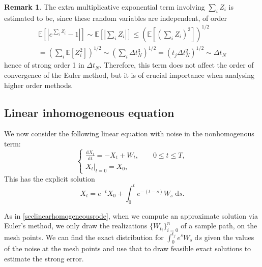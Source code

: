 \documentclass[reqno,12pt]{amsart}
\theoremstyle{plain}%
\theoremstyle{definition}
\newtheorem{rmk}{Remark}[section]
\begin{document}
\begin{rmk}
The extra multiplicative exponential term involving $\sum_i Z_i$ is estimated to be, since these random variables are independent, of order 
\begin{multline*}
    \mathbb{E}\left[\left|e^{\sum_i Z_i} - 1\right|\right] \sim \mathbb{E}\left[\left|\sum_i Z_i\right|\right] \leq \left(\mathbb{E}\left[\left(\sum_i Z_i\right)^2\right]\right)^{1/2} \\
    = \left(\sum_i \mathbb{E}\left[Z_i^2\right]\right)^{1/2} \sim \left(\sum_i \Delta t_N^3 \right)^{1/2} = \left(t_j \Delta t_N^2\right)^{1/2} \sim \Delta t_N
\end{multline*}
hence of strong order 1 in $\Delta t_N$. Therefore, this term does not affect the order of convergence of the Euler method, but it is of crucial importance when analysing higher order methods.
\end{rmk}

\subsection{Linear inhomogeneous equation}

We now consider the following linear equation with noise in the nonhomogenous term:
\begin{equation}
    \label{linearnonhomogeneousrode}
    \begin{cases}
        \displaystyle \frac{\mathrm{d}X_t}{\mathrm{d} t} = -X_t + W_t, \qquad 0 \leq t \leq T, \\
        \left. X_t \right|_{t = 0} = X_0,
      \end{cases}
\end{equation}
This has the explicit solution
\begin{equation}
    X_t = e^{-t}X_0 + \int_0^t e^{-(t-s)}W_s\;\mathrm{d}s.
\end{equation}

As in \cref{seclinearhomogeneousrode}, when we compute an approximate solution via Euler's method, we only draw the realizations $\{W_{t_i}\}_{i=0}^n$ of a sample path, on the mesh points. We can find the exact distribution for $\int_0^{t_j} e^{s} W_s\;\mathrm{d}s$ given the values of the noise at the mesh points and use that to draw feasible exact solutions to estimate the strong error.
\end{document}
